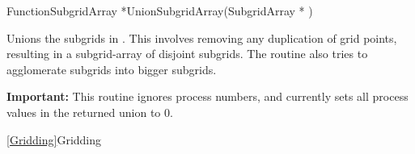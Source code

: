 
\begin{deftypefn}{Function}{SubgridArray *}{UnionSubgridArray}({SubgridArray *} )

\DESCRIPTION
Unions the subgrids in .
This involves removing any duplication of grid points, resulting in
a subgrid-array of disjoint subgrids.
The routine also tries to agglomerate subgrids into bigger subgrids.

\NOTES
{\bf Important:} This routine ignores process numbers, and currently
sets all process values in the returned union to 0.

\SEEALSO
\vref{Gridding}{Gridding}

\end{deftypefn}

